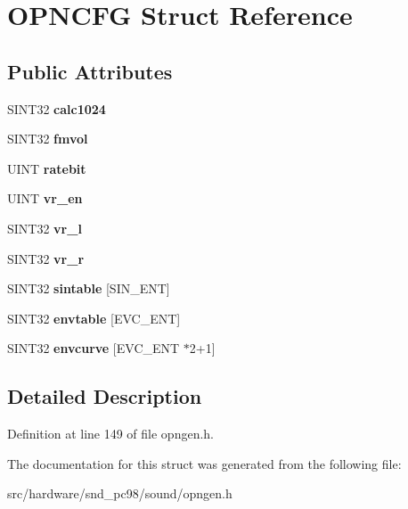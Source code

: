 \hypertarget{structOPNCFG}{\section{O\-P\-N\-C\-F\-G Struct Reference}
\label{structOPNCFG}
}
\subsection*{Public Attributes}
\begin{DoxyCompactItemize}
\item 
\hypertarget{structOPNCFG_a9d1031cf2cfa09bb3c5246a6c021bc70}{S\-I\-N\-T32 {\bfseries calc1024}}\label{structOPNCFG_a9d1031cf2cfa09bb3c5246a6c021bc70}

\item 
\hypertarget{structOPNCFG_ae10a40a4d7e215bfbccc98969f5939bc}{S\-I\-N\-T32 {\bfseries fmvol}}\label{structOPNCFG_ae10a40a4d7e215bfbccc98969f5939bc}

\item 
\hypertarget{structOPNCFG_aff6e543fcaa19b567b2a0d6891e09b04}{U\-I\-N\-T {\bfseries ratebit}}\label{structOPNCFG_aff6e543fcaa19b567b2a0d6891e09b04}

\item 
\hypertarget{structOPNCFG_a101c604625f805b6eadf552894d13647}{U\-I\-N\-T {\bfseries vr\-\_\-en}}\label{structOPNCFG_a101c604625f805b6eadf552894d13647}

\item 
\hypertarget{structOPNCFG_a9fc61289b9db8f5762837877d15527d2}{S\-I\-N\-T32 {\bfseries vr\-\_\-l}}\label{structOPNCFG_a9fc61289b9db8f5762837877d15527d2}

\item 
\hypertarget{structOPNCFG_af555682bb638496adeee8de37f2eb6e0}{S\-I\-N\-T32 {\bfseries vr\-\_\-r}}\label{structOPNCFG_af555682bb638496adeee8de37f2eb6e0}

\item 
\hypertarget{structOPNCFG_ab30803907a3b8c1b818e281414500f98}{S\-I\-N\-T32 {\bfseries sintable} \mbox{[}S\-I\-N\-\_\-\-E\-N\-T\mbox{]}}\label{structOPNCFG_ab30803907a3b8c1b818e281414500f98}

\item 
\hypertarget{structOPNCFG_a6dcc2259f7e86a28f99080edb44c6ccd}{S\-I\-N\-T32 {\bfseries envtable} \mbox{[}E\-V\-C\-\_\-\-E\-N\-T\mbox{]}}\label{structOPNCFG_a6dcc2259f7e86a28f99080edb44c6ccd}

\item 
\hypertarget{structOPNCFG_afe99ed66b1fcd13e3a9fb73ae3ba1f68}{S\-I\-N\-T32 {\bfseries envcurve} \mbox{[}E\-V\-C\-\_\-\-E\-N\-T $\ast$2+1\mbox{]}}\label{structOPNCFG_afe99ed66b1fcd13e3a9fb73ae3ba1f68}

\end{DoxyCompactItemize}


\subsection{Detailed Description}


Definition at line 149 of file opngen.\-h.



The documentation for this struct was generated from the following file\-:\begin{DoxyCompactItemize}
\item 
src/hardware/snd\-\_\-pc98/sound/opngen.\-h\end{DoxyCompactItemize}
